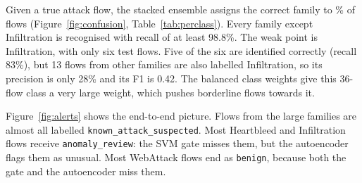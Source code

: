 Given a true attack flow, the stacked ensemble assigns the correct family to \EoneStackAccuracy\% of flows (Figure~\ref{fig:confusion}, Table~\ref{tab:perclass}). Every family except Infiltration is recognised with recall of at least 98.8\%. The weak point is Infiltration, with only six test flows. Five of the six are identified correctly (recall 83\%), but 13 flows from other families are also labelled Infiltration, so its precision is only 28\% and its F1 is 0.42. The balanced class weights give this 36-flow class a very large weight, which pushes borderline flows towards it.

Figure~\ref{fig:alerts} shows the end-to-end picture. Flows from the large families are almost all labelled \texttt{known\_attack\_suspected}. Most Heartbleed and Infiltration flows receive \texttt{anomaly\_review}: the SVM gate misses them, but the autoencoder flags them as unusual. Most WebAttack flows end as \texttt{benign}, because both the gate and the autoencoder miss them.
